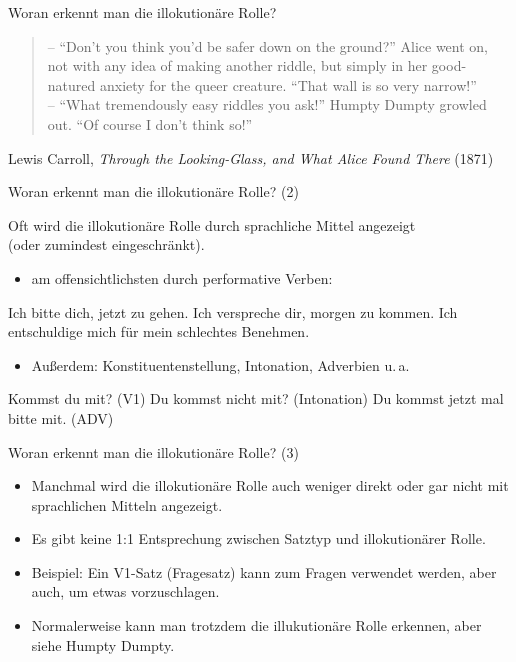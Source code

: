 \begin{frame}{Woran erkennt man die illokutionäre Rolle?}
 
  \begin{quote}
    -- ``Don't you think you'd be safer down on the ground?'' Alice went on, not with any idea of making another riddle, but simply in her good-natured anxiety for the queer creature. ``That wall is so very narrow!''\\
 -- ``What tremendously easy riddles you ask!'' Humpty Dumpty growled out. ``Of course I don't think so!''
  \end{quote}

 {\small Lewis Carroll, \textit{Through the Looking-Glass, and What Alice Found There} (1871)}


\end{frame}


\begin{frame}{Woran erkennt man die illokutionäre Rolle? (2)}

Oft wird die illokutionäre Rolle durch sprachliche Mittel angezeigt\\ (oder zumindest eingeschränkt).
\pause

\begin{itemize}
\item am offensichtlichsten durch \alert{performative Verben}:
\end{itemize}

\begin{exe}
  \ex Ich \alert{bitte} dich, jetzt zu gehen.
  \ex Ich \alert{verspreche} dir, morgen zu kommen.
  \ex Ich \alert{entschuldige} mich für mein schlechtes Benehmen.
\end{exe}
\pause


\begin{itemize}
\item Außerdem: Konstituentenstellung, Intonation, Adverbien u.\,a.
\end{itemize}
\pause

\begin{exe}
  \ex Kommst du mit? (V1)
  \ex Du kommst nicht mit? (Intonation)
  \ex Du kommst jetzt mal bitte mit. (ADV)
\end{exe}

\end{frame}


\begin{frame}{Woran erkennt man die illokutionäre Rolle? (3)}
  
\begin{itemize}
\item Manchmal wird die illokutionäre Rolle auch weniger direkt oder gar nicht mit sprachlichen Mitteln angezeigt. \pause
\item Es gibt keine 1:1 Entsprechung zwischen Satztyp und illokutionärer Rolle. \pause
\item Beispiel: Ein V1-Satz (Fragesatz) kann zum Fragen verwendet werden, aber auch, um etwas vorzuschlagen.\pause
\item Normalerweise kann man trotzdem die illukutionäre Rolle erkennen, aber siehe Humpty Dumpty.
\end{itemize}


\end{frame}

